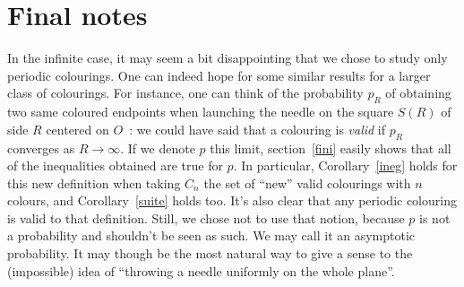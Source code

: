 \documentclass[a4paper,11pt]{article}
\theoremstyle{definition}
\theoremstyle{remark}
\begin{document}
\section{Final notes}
In the infinite case, it may seem a bit disappointing that we chose to study 
only periodic colourings. One can indeed hope for some similar results for a 
larger class of colourings. For instance, one can think of the probability $p_R$ 
of obtaining two same coloured endpoints when launching the needle on the square 
$S(R)$ of side $R$ centered on $O$~: we could have said that a colouring is 
\emph{valid} if $p_R$ converges 
as $R \rightarrow \infty$. If we denote $p$ this limit, section~\ref{fini} 
easily shows that all of the inequalities obtained are true for $p$. In particular, 
Corollary~\ref{ineg} holds for this new definition when taking $C_n$ the set of 
``new'' valid colourings with $n$ colours, and Corollary~\ref{suite} holds too. 
It's also clear that any periodic colouring is valid to that 
definition. Still, we chose not to use that notion, because $p$ is not a 
probability and shouldn't be 
seen as such. We may call it an asymptotic probability. It may though be the 
most natural way to give a sense to 
the (impossible) idea of ``throwing a needle uniformly on the whole plane''.
\end{document}
